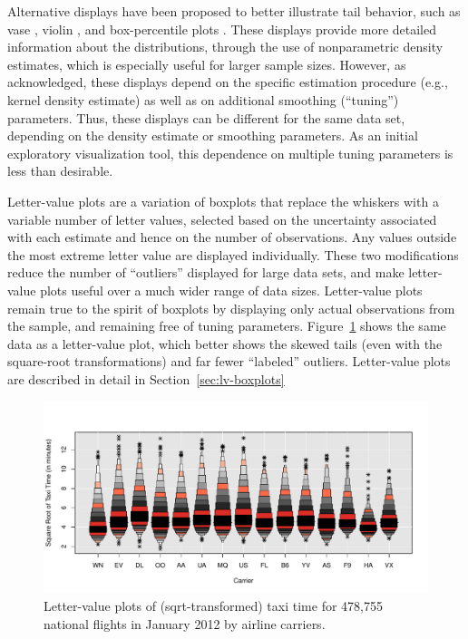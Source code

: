 \documentclass[12pt,oneside]{article}
\begin{document}

Alternative displays have been proposed to better illustrate tail behavior,
such as vase \citep{vase}, violin \citep{violin}, and box-percentile plots
\citep{box.percentiles}. These displays provide more detailed information
about the distributions, through the use of nonparametric density estimates,
which is especially useful for larger sample sizes. However, as \citet{vase}
acknowledged, these displays depend on the specific estimation procedure
(e.g., kernel density estimate) as well as on additional smoothing
(``tuning'') parameters. Thus, these displays can be different for the same
data set, depending on the density estimate or smoothing parameters. As an
initial exploratory visualization tool, this dependence on multiple tuning
parameters is less than desirable.

Letter-value plots are a variation of boxplots that replace the whiskers with
a variable number of letter values, selected based on the uncertainty
associated with each estimate and hence on the number of observations. Any
values outside the most extreme letter value are displayed individually. These
two modifications reduce the number of ``outliers'' displayed for large data
sets, and make letter-value plots useful over a much wider range of data
sizes. Letter-value plots remain true to the spirit of boxplots by displaying
only actual observations from the sample, and remaining free of tuning
parameters. Figure~\ref{fig:taxi-lv} shows the same data as a
letter-value plot, which better shows the skewed tails (even with the
square-root transformations) and far fewer ``labeled'' outliers. Letter-value
plots are described in detail in Section~\ref{sec:lv-boxplots}

\begin{figure}[hbtp]
  \centering
  \includegraphics[width=\linewidth]{taxi-lv}

  \caption{Letter-value plots of (sqrt-transformed) taxi time for 478,755 national flights in January 2012 by airline carriers.}

  \label{fig:taxi-lv} 
\end{figure}
\end{document}
